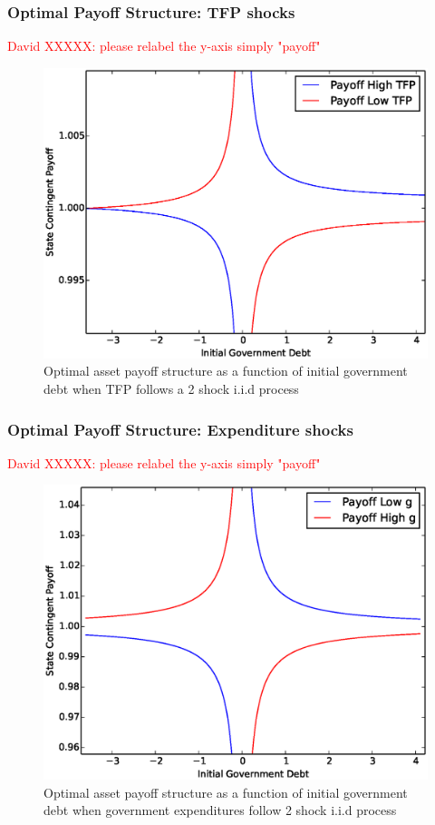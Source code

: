 \documentclass{beamer}
\begin{document}
  \begin{frame}
   \frametitle{Optimal Payoff Structure: TFP shocks}
   \textcolor{red}{David XXXXX: please relabel the y-axis simply "payoff"}
	\begin{figure}
		\begin{center}
		\includegraphics[scale=.4]{Images/p_graph_tfp.eps}
		\caption{Optimal asset payoff structure as a function of initial government debt when TFP follows a 2 shock i.i.d process}
	\end{center}	
	\end{figure}

  \end{frame}

%
  \begin{frame}
   \frametitle{Optimal Payoff Structure: Expenditure shocks}
   \textcolor{red}{David XXXXX: please relabel the y-axis simply "payoff"}
	\begin{figure}
		\begin{center}
		\includegraphics[scale=.4]{Images/p_graph.eps}
		\caption{Optimal asset payoff structure as a function of initial government debt when government expenditures follow 2 shock i.i.d process}
	\end{center}	
	\end{figure}

  \end{frame}
%
%
\end{document}
